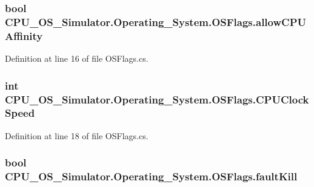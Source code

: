 \subsubsection[{allow\+C\+P\+U\+Affinity}]{\setlength{\rightskip}{0pt plus 5cm}bool C\+P\+U\+\_\+\+O\+S\+\_\+\+Simulator.\+Operating\+\_\+\+System.\+O\+S\+Flags.\+allow\+C\+P\+U\+Affinity}\label{struct_c_p_u___o_s___simulator_1_1_operating___system_1_1_o_s_flags_ac1d1812ad9ef56ccadacb19831d2e92d}


Definition at line 16 of file O\+S\+Flags.\+cs.

\hypertarget{struct_c_p_u___o_s___simulator_1_1_operating___system_1_1_o_s_flags_a51541aa57e2e3114e111faff27a5d4cd}{}
\subsubsection[{C\+P\+U\+Clock\+Speed}]{\setlength{\rightskip}{0pt plus 5cm}int C\+P\+U\+\_\+\+O\+S\+\_\+\+Simulator.\+Operating\+\_\+\+System.\+O\+S\+Flags.\+C\+P\+U\+Clock\+Speed}\label{struct_c_p_u___o_s___simulator_1_1_operating___system_1_1_o_s_flags_a51541aa57e2e3114e111faff27a5d4cd}


Definition at line 18 of file O\+S\+Flags.\+cs.

\hypertarget{struct_c_p_u___o_s___simulator_1_1_operating___system_1_1_o_s_flags_ab6e0543edd30b393255293bccf19c9d1}{}
\subsubsection[{fault\+Kill}]{\setlength{\rightskip}{0pt plus 5cm}bool C\+P\+U\+\_\+\+O\+S\+\_\+\+Simulator.\+Operating\+\_\+\+System.\+O\+S\+Flags.\+fault\+Kill}\label{struct_c_p_u___o_s___simulator_1_1_operating___system_1_1_o_s_flags_ab6e0543edd30b393255293bccf19c9d1}


